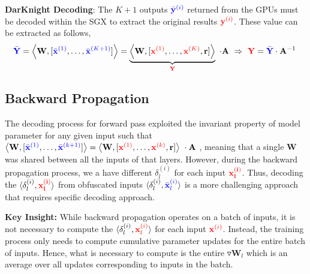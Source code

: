 \textbf{DarKnight Decoding}:  The $K+1$ outputs ${\color{blue}\bar{\mathbf y}^{(i)}}$ returned from the GPUs must be decoded within the SGX to extract the original results ${\color{red}\mathbf y^{(i)}}$.  These value can be extracted  as follows,
\begin{align}
    {\color{blue}\bar{\mathbf Y}}=\left\langle \mathbf W, [{\color{blue}\bar{\mathbf x}^{(1)}},\dots,{\color{blue}\bar{\mathbf x}^{(K+1)}}] \right\rangle =
    \underbrace{\left\langle \mathbf W, [{\color{red}{\mathbf x}^{(1)}},\dots,{\color{red}\mathbf x^{(K)}},\mathbf r] \right\rangle}_{{\color{red}\mathbf Y}} ~\cdot \mathbf A~\Rightarrow~ {{\color{red}\mathbf Y}}={\color{blue}\bar{\mathbf Y}}\cdot \mathbf A^{-1}~
\end{align}
\subsection{Backward Propagation}
 The decoding process for forward pass exploited the invariant property of model parameter for any given input such  that $\left\langle \mathbf W, [{\color{blue}\bar{\mathbf x}^{(1)}},\dots,{\color{blue}\bar{\mathbf x}^{(k+1)}}] \right\rangle = \left\langle \mathbf W, [{\color{red}{\mathbf x}^{(1)}},\dots,{\color{red}\mathbf x^{(k)}},\mathbf r] \right\rangle ~\cdot \mathbf A~$, meaning that a single $\mathbf{W}$ was shared between all the inputs of that layers. However, during the backward propagation process, we a have different $\delta_l^{(i)}$ for each input $\mathbf {\color{red}x_l^{(i)}}$. Thus, decoding the $\langle \delta^{(i)}_{l}, \mathbf {\color{red}x^{(i)}_{l}}\rangle$ from obfuscated inputs $\langle \delta^{(i)}_{l} , {\color{blue}\bar{\mathbf x}^{(i)}_{l}}\rangle$  is a more challenging approach that requires specific decoding approach.

\textbf{Key Insight:} While backward propagation operates on a batch of inputs, it is not necessary to compute the $\langle \delta^{(i)}_{l}, {\color{red}\mathbf x^{(i)}_{l}}\rangle$ for each input ${\color{red}\mathbf x^{(i)}}$. Instead, the training process only needs to compute cumulative parameter updates for the entire batch of inputs. Hence, what is necessary to compute is the entire $\triangledown \mathbf{W}_{l}$ which is an average over all  updates corresponding to inputs in the batch. 

